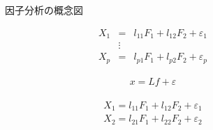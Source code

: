 \documentclass[a4j,11pt,mc]{jreport}
\begin{document}
\begin{figure}[H]
  \begin{center}
	\caption{因子分析の概念図}
	\label{FAdiagram}
\end{center}
\end{figure}




	\begin{eqnarray}
	X_1 &=&l_{11}F_1+l_{12}F_2+\varepsilon_1\\
	&\vdots&\\\nonumber
	X_p &=&l_{p1}F_1+l_{p2}F_2+\varepsilon_p
	\end{eqnarray}



		\begin{eqnarray}
		x=Lf+\varepsilon
		\end{eqnarray}

	\begin{eqnarray}
	\begin{split}
	X_1 =l_{11}F_1+l_{12}F_2+\varepsilon_1\\
	\nonumber
	X_2 =l_{21}F_1+l_{22}F_2+\varepsilon_2\\
	\end{split}
	\end{eqnarray}
\end{document}
